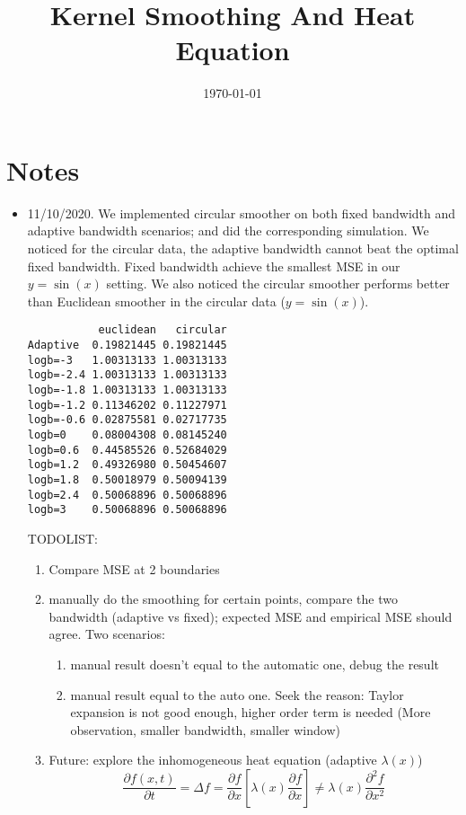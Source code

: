 \documentclass{article}
\title{Kernel Smoothing And Heat Equation}
\date{\today}
\begin{document}
\maketitle

\section{Notes}
\label{sec:notes}

\begin{itemize}
\item 11/10/2020. We implemented circular smoother on both fixed bandwidth and adaptive bandwidth scenarios; and did the corresponding simulation. We noticed for the circular data, the adaptive bandwidth cannot beat the optimal fixed bandwidth. Fixed bandwidth achieve the smallest MSE in our $y=\sin(x)$ setting. We also noticed the circular smoother performs better than Euclidean smoother in the circular data ($y=\sin(x)$). 
\begin{verbatim}
           euclidean   circular
Adaptive  0.19821445 0.19821445
logb=-3   1.00313133 1.00313133
logb=-2.4 1.00313133 1.00313133
logb=-1.8 1.00313133 1.00313133
logb=-1.2 0.11346202 0.11227971
logb=-0.6 0.02875581 0.02717735
logb=0    0.08004308 0.08145240
logb=0.6  0.44585526 0.52684029
logb=1.2  0.49326980 0.50454607
logb=1.8  0.50018979 0.50094139
logb=2.4  0.50068896 0.50068896
logb=3    0.50068896 0.50068896
\end{verbatim}


TODOLIST:
  \begin{enumerate}
    \item Compare MSE at 2 boundaries 
    \item manually do the smoothing for certain points, compare the two bandwidth (adaptive vs fixed); expected MSE and empirical MSE should agree. Two scenarios:
    \begin{enumerate}
    \item manual result doesn't equal to the automatic one, debug the result
    \item manual result equal to the auto one. Seek the reason: Taylor expansion is not good enough, higher order term is needed (More observation, smaller bandwidth, smaller window)
    \end{enumerate}
    \item Future: explore the inhomogeneous heat equation (adaptive $\lambda(x)$) 
    $$\frac{\partial f(x,t)}{\partial t}  = \Delta f = \frac{\partial f}{\partial x}[\lambda(x)\frac{\partial f}{\partial x}] \neq  \lambda(x)\frac{\partial^2 f}{
    \partial x^2} $$


\end{enumerate}
\end{itemize}
\end{document}
